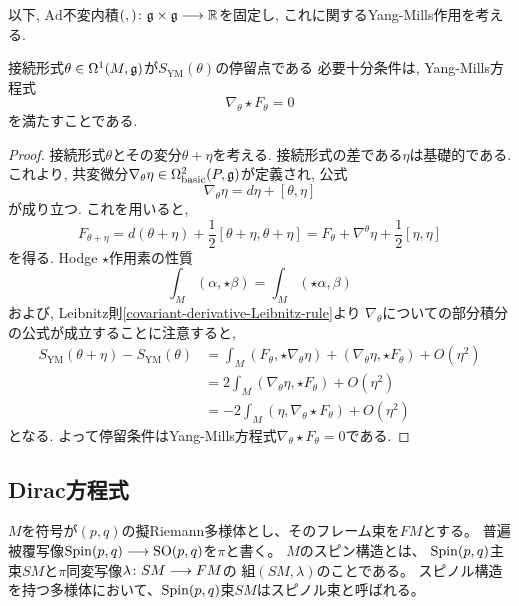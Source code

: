 以下, $\mathrm{Ad}$不変内積$(,) \colon \mathfrak{g} \times \mathfrak{g} \longrightarrow \mathbb{R}$を固定し,
これに関するYang-Mills作用を考える.

\begin{thm}
  接続形式$\theta \in \Omega^1(M,\mathfrak{g})$が$S_{\mathrm{YM}}(\theta)$の停留点である
  必要十分条件は, Yang-Mills方程式
  \begin{equation}
    \nabla_\theta \star F_\theta = 0
  \end{equation}
  を満たすことである.
\end{thm}

\begin{proof}
  接続形式$\theta$とその変分$\theta + \eta$を考える.
  接続形式の差である$\eta$は基礎的である.
  これより,
  共変微分$\nabla_\theta \eta \in \Omega^2_\mathrm{basic}(P,\mathfrak{g})$が定義され,
  公式
  \begin{equation}
    \nabla_\theta \eta = d\eta + [\theta, \eta]
  \end{equation}
  が成り立つ.
  これを用いると,
  \begin{equation}
    F_{\theta+\eta} = d(\theta+\eta) + \frac{1}{2}[\theta+\eta, \theta+\eta]
    = F_\theta + \nabla^{\theta}\eta + \frac{1}{2}[\eta,\eta]
  \end{equation}
  を得る.
  Hodge $\star$作用素の性質
  \begin{equation}
    \int_M (\alpha, \star\beta) = \int_M (\star\alpha, \beta)
  \end{equation}
  および,
  Leibnitz則\ref{covariant-derivative-Leibnitz-rule}より
  $\nabla_\theta$についての部分積分の公式が成立することに注意すると,
  \begin{align*}
    S_\mathrm{YM}(\theta+\eta) - S_\mathrm{YM}(\theta) &=
    \int_M (F_\theta, \star\nabla_\theta\eta) +
    (\nabla_\theta\eta, \star F_\theta) + O(\eta^2) \\ &=
    2 \int_M (\nabla_\theta\eta, \star F_\theta) + O(\eta^2) \\ &=
    -2 \int_M (\eta, \nabla_\theta \star F_\theta) + O(\eta^2)
  \end{align*}
  となる.
  よって停留条件はYang-Mills方程式$\nabla_\theta\star F_\theta=0$である.
\end{proof}

\subsection{Dirac方程式}

\begin{dfn}
 $M$を符号が$(p,q)$の擬Riemann多様体とし、そのフレーム束を$FM$とする。
 普遍被覆写像$\operatorname{Spin}(p,q)\longrightarrow\operatorname{SO}(p,q)$を$\pi$と書く。
 $M$のスピン構造とは、
 $\operatorname{Spin}(p,q)$主束$SM$と$\pi$同変写像$\lambda \colon SM\longrightarrow FM$の
 組$(SM,\lambda)$のことである。
 スピノル構造を持つ多様体において、$\operatorname{Spin}(p,q)$束$SM$はスピノル束と呼ばれる。
\end{dfn}


